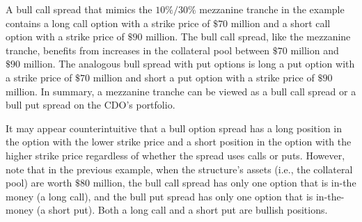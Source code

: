 \documentclass[11pt]{article}
\begin{document}
A bull call spread that mimics the $10 \% / 30 \%$ mezzanine tranche in the example contains a long call option with a strike price of $\$ 70$ million and a short call option with a strike price of $\$ 90$ million. The bull call spread, like the mezzanine tranche, benefits from increases in the collateral pool between $\$ 70$ million and $\$ 90$ million. The analogous bull spread with put options is long a put option with a strike price of $\$ 70$ million and short a put option with a strike price of $\$ 90$ million. In summary, a mezzanine tranche can be viewed as a bull call spread or a bull put spread on the CDO's portfolio.

It may appear counterintuitive that a bull option spread has a long position in the option with the lower strike price and a short position in the option with the higher strike price regardless of whether the spread uses calls or puts. However, note that in the previous example, when the structure's assets (i.e., the collateral pool) are worth $\$ 80$ million, the bull call spread has only one option that is in-the money (a long call), and the bull put spread has only one option that is in-the-money (a short put). Both a long call and a short put are bullish positions.
\end{document}
